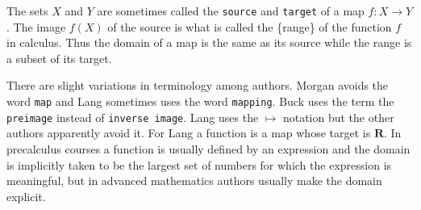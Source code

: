 \documentclass[10pt,a4paper,UTF8]{article}
\begin{document}
The sets \(X\)  and \(Y\) are sometimes called the
\texttt{source} and \texttt{target} of a map \(f:X\to Y\).
The image \(f(X)\) of the source is what is called the \{range\}
of the function \(f\) in calculus.
Thus the domain of a map is the same as its source
while the range is a subset of its target.

There are slight variations in terminology among  authors.
Morgan avoids the word \texttt{map} and Lang sometimes
uses the word \texttt{mapping}.  Buck uses the term the \texttt{preimage}
instead of \texttt{inverse image}. Lang  uses the \(\mapsto\)
notation but the other authors apparently avoid it.
For Lang a function is a map whose target is \(\mathbf{R}\).
In precalculus courses a function is usually defined by an expression
and the domain is implicitly taken to be the largest set of numbers
for which the expression is meaningful, but in advanced mathematics
authors usually make the domain explicit.
\end{document}
